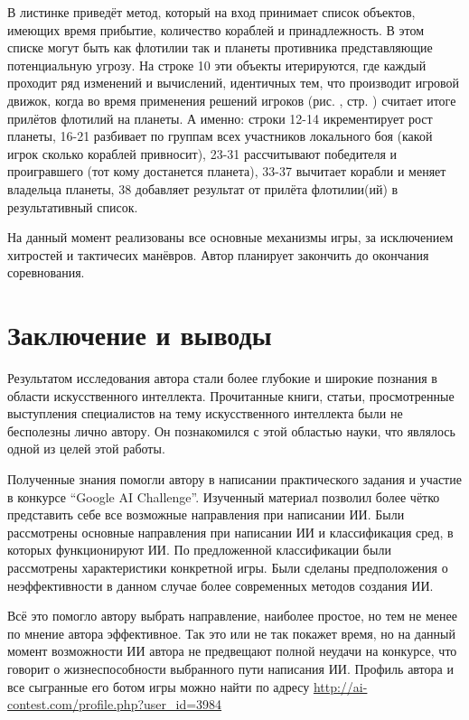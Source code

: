 \documentclass[12pt]{report}
\begin{document}
В листинке приведёт метод, который на вход принимает список объектов, имеющих время прибытие, количество кораблей и принадлежность. В этом списке могут быть как флотилии так и планеты противника представляющие потенциальную угрозу. На строке 10 эти объекты итерируются, где каждый проходит ряд изменений и вычислений, идентичных тем, что производит игровой движок, когда во время применения решений игроков (рис. , стр. ) считает итоге прилётов флотилий на планеты. А именно: строки 12-14 икрементирует рост планеты, 16-21 разбивает по группам всех участников локального боя (какой игрок сколько кораблей привносит), 23-31 рассчитывают победителя и проигравшего (тот кому достанется планета), 33-37 вычитает корабли и меняет владельца планеты, 38 добавляет результат от прилёта флотилии(ий) в результативный список.

На данный момент реализованы все основные механизмы игры, за исключением хитростей и тактичесих манёвров. Автор планирует закончить до окончания соревнования.

\chapter*{Заключение и выводы}
\thispagestyle{fancy}
Результатом исследования автора стали более глубокие и широкие познания в области искусственного интеллекта. Прочитанные книги, статьи, просмотренные выступления специалистов на тему искусственного интеллекта были не бесполезны лично автору. Он познакомился с этой областью науки, что являлось одной из целей этой работы.

Полученные знания помогли автору в написании практического задания и участие в конкурсе ``Google AI Challenge''. Изученный материал позволил более чётко представить себе все возможные направления при написании ИИ. Были рассмотрены основные направления при написании ИИ и классификация сред, в которых функционируют ИИ. По предложенной классификации были рассмотрены характеристики конкретной игры. Были сделаны предположения о неэффективности в данном случае более современных методов создания ИИ.

Всё это помогло автору выбрать направление, наиболее простое, но тем не менее по мнение автора эффективное. Так это или не так покажет время, но на данный момент возможности ИИ автора не предвещают полной неудачи на конкурсе, что говорит о жизнеспособности выбранного пути написания ИИ. Профиль автора и все сыгранные его ботом игры можно найти по адресу \url{http://ai-contest.com/profile.php?user\_id=3984}
\end{document}
